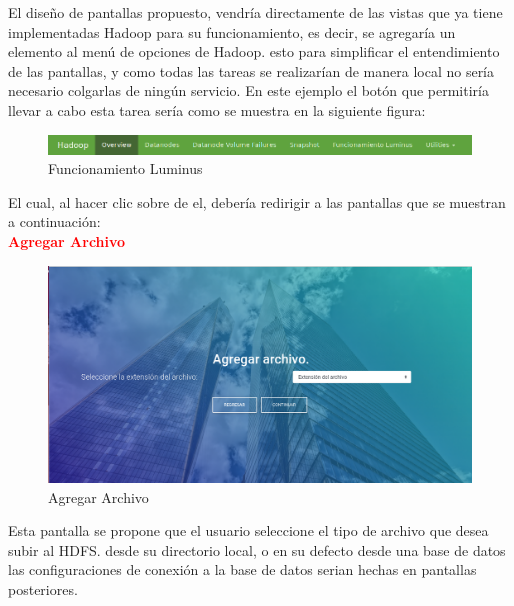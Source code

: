 El diseño de pantallas propuesto, vendría directamente de las vistas que ya tiene implementadas Hadoop para su funcionamiento, es decir, se agregaría un elemento al menú de opciones de Hadoop. esto para simplificar el entendimiento de las pantallas, y como todas las tareas se realizarían de manera local no sería necesario colgarlas de ningún servicio. En este ejemplo el botón que permitiría llevar a cabo esta tarea sería  como se muestra en la siguiente figura:\\
\begin{figure}[H]
	\hypertarget{fig:red}{\hspace{1pt}}
	\begin{center}
		\includegraphics[width=.9\textwidth]{capitulo7/images/menu.png}
		\caption{Funcionamiento Luminus}
		\label{fig:agre}
	\end{center}
\end{figure}
El cual, al hacer clic sobre de el, debería redirigir a las pantallas que se muestran a continuación:
\\
\textbf{\textcolor{red}{Agregar Archivo}}
\begin{figure}[H]
	\hypertarget{fig:red}{\hspace{1pt}}
	\begin{center}
		\includegraphics[width=1\textwidth]{capitulo7/images/AgregarArchivo.png}
		\caption{Agregar Archivo}
		\label{fig:agre}
	\end{center}
\end{figure}
Esta pantalla se propone que el usuario seleccione el tipo de archivo que desea subir al HDFS. desde su directorio local, o en su defecto desde una base de datos las configuraciones de conexión a la base de datos serian hechas en pantallas posteriores.\\
